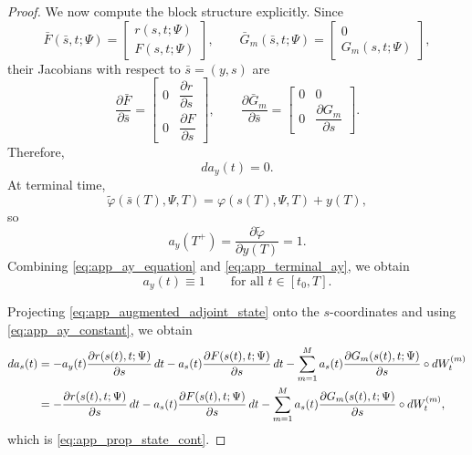 \documentclass[11pt]{article}
\theoremstyle{definition}
\numberwithin{equation}{section}
\numberwithin{theorem}{section}
\numberwithin{proposition}{section}
\numberwithin{lemma}{section}
\numberwithin{corollary}{section}
\numberwithin{definition}{section}
\numberwithin{remark}{section}
\newcommand{\1}{\mathbbm{1}}
\begin{document}
\begin{proof}
We now compute the block structure explicitly. Since
\[
\bar F(\bar s,t;\Psi)
=
\begin{bmatrix}
r(s,t;\Psi)\\
F(s,t;\Psi)
\end{bmatrix},
\qquad
\bar G_m(\bar s,t;\Psi)
=
\begin{bmatrix}
0\\
G_m(s,t;\Psi)
\end{bmatrix},
\]
their Jacobians with respect to $\bar s=(y,s)$ are
\begin{equation}
\label{eq:app_augmented_block_jacobians}
\frac{\partial \bar F}{\partial \bar s}
=
\begin{bmatrix}
0 & \dfrac{\partial r}{\partial s}\\[1.2ex]
0 & \dfrac{\partial F}{\partial s}
\end{bmatrix},
\qquad
\frac{\partial \bar G_m}{\partial \bar s}
=
\begin{bmatrix}
0 & 0\\
0 & \dfrac{\partial G_m}{\partial s}
\end{bmatrix}.
\end{equation}
Therefore,
\begin{equation}
\label{eq:app_ay_equation}
da_y(t)=0.
\end{equation}
At terminal time,
\[
\tilde \varphi(\bar s(T),\Psi,T)=\varphi(s(T),\Psi,T)+y(T),
\]
so
\begin{equation}
\label{eq:app_terminal_ay}
a_y(T^+)=\frac{\partial \tilde \varphi}{\partial y(T)}=1.
\end{equation}
Combining \eqref{eq:app_ay_equation} and \eqref{eq:app_terminal_ay}, we obtain
\begin{equation}
\label{eq:app_ay_constant}
a_y(t)\equiv 1
\qquad \text{for all } t\in[t_0,T].
\end{equation}

Projecting \eqref{eq:app_augmented_adjoint_state} onto the $s$-coordinates and using \eqref{eq:app_ay_constant}, we obtain
\begin{align}
da_s(t)
&=
-a_y(t)\frac{\partial r(s(t),t;\Psi)}{\partial s}\,dt
-a_s(t)\frac{\partial F(s(t),t;\Psi)}{\partial s}\,dt
-\sum_{m=1}^M a_s(t)\frac{\partial G_m(s(t),t;\Psi)}{\partial s}\circ dW_t^{(m)}
\notag\\
&=
-\frac{\partial r(s(t),t;\Psi)}{\partial s}\,dt
-a_s(t)\frac{\partial F(s(t),t;\Psi)}{\partial s}\,dt
-\sum_{m=1}^M a_s(t)\frac{\partial G_m(s(t),t;\Psi)}{\partial s}\circ dW_t^{(m)},
\end{align}
which is \eqref{eq:app_prop_state_cont}.


\end{proof}
\end{document}
